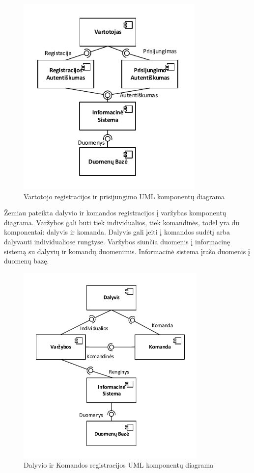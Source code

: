 \documentclass{VUMIFPSkursinis}
\begin{document}
		\begin{figure}[H]
			\centering
			\includegraphics[width=\textwidth, height=10cm, keepaspectratio]{img/KomponentuDiagrama1}
			\caption{Vartotojo registracijos ir prisijungimo UML komponentų diagrama}
			\label{fig:VartotojoRegistracijosIrPrisijungimoUMLKomponentuDiagrama}
		\end{figure}
		
		Žemiau pateikta dalyvio ir komandos registracijos į varžybas komponentų diagrama. 
		Varžybos gali būti tiek individualios, tiek komandinės, todėl yra du komponentai: dalyvis ir komanda. 
		Dalyvis gali įeiti į komandos sudėtį arba dalyvauti individualiose rungtyse. 
		Varžybos siunčia duomenis į informacinę sistemą su dalyvių ir komandų duomenimis. 
		Informacinė sistema įrašo duomenis į duomenų bazę.
		
		\begin{figure}[H]
			\centering
			\includegraphics[width=\textwidth, height=10cm, keepaspectratio]{img/KomponentuDiagrama2}
			\caption{Dalyvio ir Komandos registracijos UML komponentų diagrama}
			\label{fig:DalyvioIrKomandosRegistracijosUMLBusenuDiagrama}
		\end{figure}
		
\end{document}
